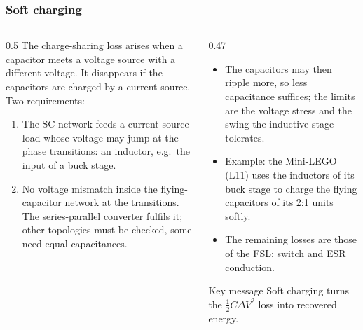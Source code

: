 \begin{frame}
	\frametitle{Soft charging}
	\begin{columns}[T]
		\begin{column}{0.5\textwidth}
			\small
			The charge-sharing loss arises when a capacitor meets a voltage source with a different voltage. It disappears if the capacitors are charged by a current source. Two requirements:
			\begin{enumerate}
				\item The SC network feeds a current-source load whose voltage may jump at the phase transitions: an inductor, e.g.\ the input of a buck stage.
				\item No voltage mismatch inside the flying-capacitor network at the transitions. The series-parallel converter fulfils it; other topologies must be checked, some need equal capacitances.
			\end{enumerate}
		\end{column}
		\begin{column}{0.47\textwidth}
			\small
			\begin{itemize}
				\item The capacitors may then ripple more, so less capacitance suffices; the limits are the voltage stress and the swing the inductive stage tolerates.
				\item Example: the Mini-LEGO (L11) uses the inductors of its buck stage to charge the flying capacitors of its 2:1 units softly.
				\item The remaining losses are those of the FSL: switch and ESR conduction.
			\end{itemize}
			\begin{block}{Key message}
				Soft charging turns the $\tfrac12C\Delta V^2$ loss into recovered energy.
			\end{block}
		\end{column}
	\end{columns}
\end{frame}

